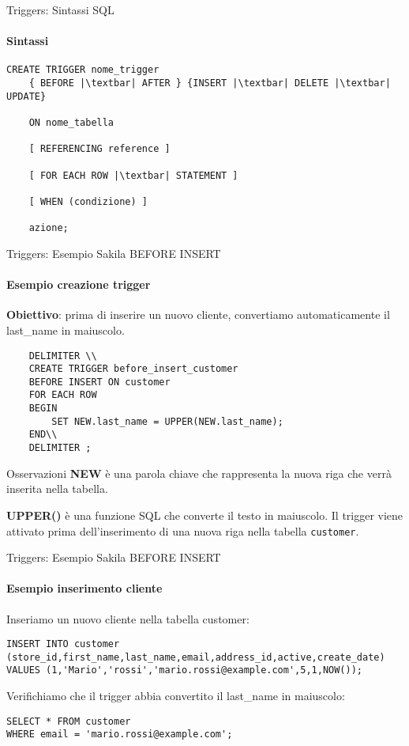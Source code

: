 %
\begin{frame}[fragile]{Triggers: Sintassi SQL}
\framesubtitle{Sintassi}
\vspace{-.5cm}
\begin{lstlisting}
CREATE TRIGGER nome_trigger
    { BEFORE |\textbar| AFTER } {INSERT |\textbar| DELETE |\textbar| UPDATE}

    ON nome_tabella

    [ REFERENCING reference ]

    [ FOR EACH ROW |\textbar| STATEMENT ]

    [ WHEN (condizione) ]

    azione;
\end{lstlisting}

\end{frame}
%
\begin{frame}[fragile]{Triggers: Esempio Sakila BEFORE INSERT}
\framesubtitle{Esempio creazione trigger}
\vspace{-.5cm}
\textbf{Obiettivo}: prima di inserire un nuovo cliente, convertiamo automaticamente il \\last\_name in maiuscolo.

\begin{lstlisting}
    DELIMITER \\
    CREATE TRIGGER before_insert_customer
    BEFORE INSERT ON customer
    FOR EACH ROW
    BEGIN
        SET NEW.last_name = UPPER(NEW.last_name);
    END\\
    DELIMITER ;
\end{lstlisting}

\vspace{-.2cm}

\begin{block}{Osservazioni}
    \small \textbf{NEW} \`e una parola chiave che rappresenta la nuova riga che verr\`a inserita nella tabella.
    
    \textbf{UPPER()} \`e una funzione SQL che converte il testo in maiuscolo.
    Il trigger viene attivato prima dell'inserimento di una nuova riga nella tabella \texttt{customer}.
\end{block}
\end{frame}
%
\begin{frame}[fragile]{Triggers: Esempio Sakila BEFORE INSERT}
\framesubtitle{Esempio inserimento cliente}

Inseriamo un nuovo cliente nella tabella customer:
\begin{lstlisting}
INSERT INTO customer (store_id,first_name,last_name,email,address_id,active,create_date)
VALUES (1,'Mario','rossi','mario.rossi@example.com',5,1,NOW());
\end{lstlisting}

Verifichiamo che il trigger abbia convertito il last\_name in maiuscolo:
\begin{lstlisting}
SELECT * FROM customer
WHERE email = 'mario.rossi@example.com';

\end{lstlisting}

\end{frame}
